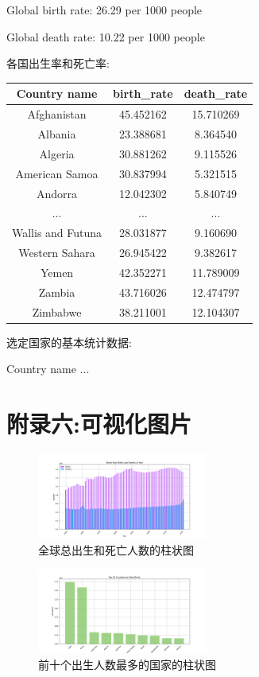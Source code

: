\documentclass{ctexart}
\begin{document}
    Global birth rate: 26.29 per 1000 people \par
    Global death rate: 10.22 per 1000 people \par
    
    各国出生率和死亡率: \par
    \begin{longtable}{|c|c|c|}
    \hline
    Country name & birth\_rate & death\_rate \\
    \hline
    Afghanistan & 45.452162 & 15.710269 \\
    Albania & 23.388681 & 8.364540 \\
    Algeria & 30.881262 & 9.115526 \\
    American Samoa & 30.837994 & 5.321515 \\
    Andorra & 12.042302 & 5.840749 \\
    ... & ... & ... \\
    Wallis and Futuna & 28.031877 & 9.160690 \\
    Western Sahara & 26.945422 & 9.382617 \\
    Yemen & 42.352271 & 11.789009 \\
    Zambia & 43.716026 & 12.474797 \\
    Zimbabwe & 38.211001 & 12.104307 \\
    \hline

    \end{longtable}
    
    选定国家的基本统计数据: \par
    Country name ...
    \newpage

    \section{附录六:可视化图片}
    \begin{figure}[h!]
        \centering
        \includegraphics[width=0.5\textwidth]{img/全球总出生和死亡人数的柱状图.png}
        \caption{全球总出生和死亡人数的柱状图}
        \label{4}
    \end{figure}

    \begin{figure}[h!]
        \centering
        \includegraphics[width=0.5\textwidth]{img/前十个出生人数最多的国家的柱状图.png}
        \caption{前十个出生人数最多的国家的柱状图}
        \label{4}
    \end{figure}
\end{document}
